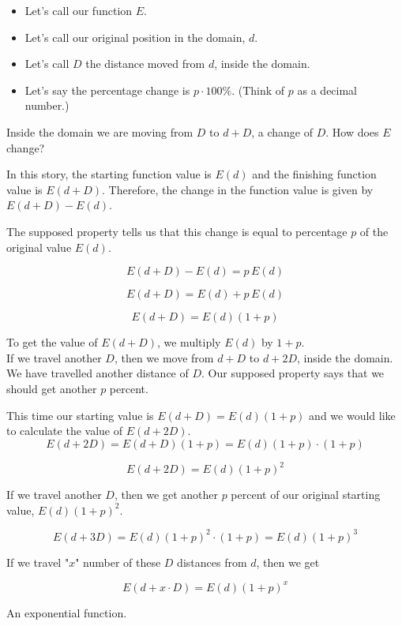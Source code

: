 \documentclass{ximera}
\begin{document}
\begin{observation}

\begin{itemize}
\item Let's call our function $E$.
\item Let's call our original position in the domain, $d$.
\item Let's call $D$ the distance moved from $d$, inside the domain.
\item Let's say the percentage change is $p \cdot 100\%$. (Think of $p$ as a decimal number.)
\end{itemize}



Inside the domain we are moving from $D$ to $d + D$, a change of $D$.  How does $E$ change?



In this story, the starting function value is $E(d)$ and the finishing function value is $E(d+D)$.  Therefore, the change in the function value is given by $E(d+D) - E(d)$.

The supposed property tells us that this change is equal to percentage $p$ of the original value $E(d)$.



\[
E(d+D) - E(d) = p \, E(d)
\]

\[
E(d+D) = E(d) + p \, E(d)
\]


\[
E(d+D) = E(d) (1+p)
\]



To get the value of $E(d+D)$, we multiply $E(d)$ by $1+p$. \\









If we travel another $D$, then we move from $d+D$ to $d+2D$, inside the domain. \\

We have travelled another distance of $D$. Our supposed property says that we should get another $p$ percent.



This time our starting value is $E(d+D) = E(d) (1+p)$ and we would like to calculate the value of $E(d+2D)$. \\




\[
E(d + 2D) = E(d+D)(1+p)  = E(d) (1+p) \cdot (1+p)
\]



\[
E(d + 2D) =  E(d) (1+p)^2
\]


If we travel another $D$, then we get another $p$ percent of our original starting value, $E(d)(1+p)^2$.


\[
E(d + 3D) = E(d)(1+p)^2 \cdot (1+p) = E(d) (1+p)^3
\]



If we travel "$x$" number of these $D$ distances from $d$, then we get

\[
E(d + x \cdot D) = E(d)(1+p)^x 
\]

An exponential function.

\end{observation}
\end{document}
